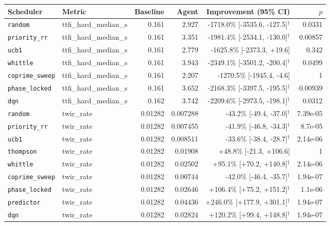 \begin{table}[t]
  \centering
  \small
  \begin{tabular}{llrrrr}
    \toprule
    Scheduler & Metric & Baseline & Agent & Improvement (95\% CI) & $p$ \\
    \midrule
    \texttt{random} & ttfi\_hard\_median\_s & 0.161 & 2.927 & -1718.0\% [-3535.6, -127.5]$^{\dagger}$ & 0.0331 \\
    \texttt{priority\_rr} & ttfi\_hard\_median\_s & 0.161 & 3.351 & -1981.4\% [-2534.1, -130.0]$^{\dagger}$ & 0.00857 \\
    \texttt{ucb1} & ttfi\_hard\_median\_s & 0.161 & 2.779 & -1625.8\% [-2373.3, +19.6] & 0.342 \\
    \texttt{whittle} & ttfi\_hard\_median\_s & 0.161 & 3.943 & -2349.1\% [-3501.2, -200.4]$^{\dagger}$ & 0.0499 \\
    \texttt{coprime\_sweep} & ttfi\_hard\_median\_s & 0.161 & 2.207 & -1270.5\% [-1945.4, -4.6] & 1 \\
    \texttt{phase\_locked} & ttfi\_hard\_median\_s & 0.161 & 3.652 & -2168.3\% [-3397.5, -195.5]$^{\dagger}$ & 0.00939 \\
    \texttt{dqn} & ttfi\_hard\_median\_s & 0.162 & 3.742 & -2209.6\% [-2973.5, -198.1]$^{\dagger}$ & 0.0312 \\
    \midrule
    \texttt{random} & twir\_rate & 0.01282 & 0.007288 & -43.2\% [-49.4, -37.0]$^{\dagger}$ & 7.39e-05 \\
    \texttt{priority\_rr} & twir\_rate & 0.01282 & 0.007455 & -41.9\% [-46.8, -34.3]$^{\dagger}$ & 8.7e-05 \\
    \texttt{ucb1} & twir\_rate & 0.01282 & 0.008511 & -33.6\% [-38.4, -28.7]$^{\dagger}$ & 2.14e-06 \\
    \texttt{thompson} & twir\_rate & 0.01282 & 0.01908 & +48.8\% [-21.3, +106.6] & 1 \\
    \texttt{whittle} & twir\_rate & 0.01282 & 0.02502 & +95.1\% [+70.2, +140.8]$^{\dagger}$ & 2.14e-06 \\
    \texttt{coprime\_sweep} & twir\_rate & 0.01282 & 0.00744 & -42.0\% [-46.4, -35.7]$^{\dagger}$ & 1.94e-07 \\
    \texttt{phase\_locked} & twir\_rate & 0.01282 & 0.02646 & +106.4\% [+75.2, +151.2]$^{\dagger}$ & 1.1e-06 \\
    \texttt{predictor} & twir\_rate & 0.01282 & 0.04436 & +246.0\% [+177.9, +301.1]$^{\dagger}$ & 1.94e-07 \\
    \texttt{dqn} & twir\_rate & 0.01282 & 0.02824 & +120.2\% [+99.4, +148.8]$^{\dagger}$ & 1.94e-07 \\

\end{tabular}
\end{table}
